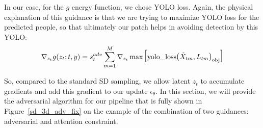 In our case, for the $g$ energy function, we chose YOLO loss.
Again, the physical explanation of this guidance is that we are trying to maximize YOLO loss for the predicted people, so that ultimately our patch helps in avoiding detection by this YOLO:
$$\nabla_{z_t}g(z_t; t, y) = s^{adv}_t \sum_{m=1}^M \nabla_{z_t}\max \text{\LARGE [} \text{yolo\_loss}\text{\large (}\Tilde{X}_{tm}, L_{tm}\text{\large )}_{\text{obj}} \text{\LARGE ]}$$

So, compared to the standard SD sampling, we allow latent $z_t$ to accumulate gradients and add this gradient to our update $\hat\epsilon_\theta$.
In this section, we will provide the adversarial algorithm for our pipeline that is fully shown in Figure~\ref{sd_3d_adv_fix} on the example of the combination of two guidances: adversarial and attention constraint.


\renewcommand{\algorithmicrequire}{\textbf{Inputs：}\unskip}
\renewcommand{\algorithmicensure}{\textbf{Output：}\unskip}
\renewcommand{\algorithmiccomment}[1]{\textcolor{gray}{{\scriptsize$\triangleright$}\,#1}}


